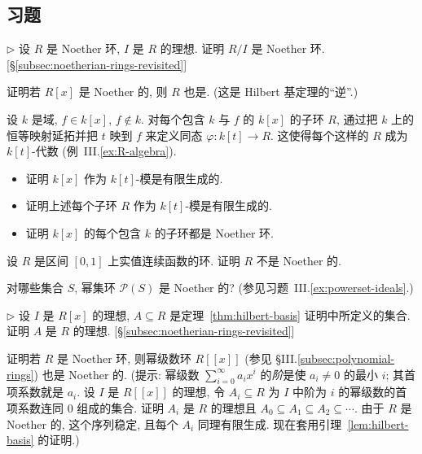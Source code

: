 \subsection*{习题}
{}

\begin{prob}
\label{ex:noeth-quotient}
$\triangleright$ 设 $R$ 是 Noether 环, $I$ 是 $R$ 的理想. 证明 $R/I$ 是 Noether 环. [§\ref{subsec:noetherian-rings-revisited}]
\end{prob}

\begin{prob}
\label{ex:hilbert-converse}
证明若 $R[x]$ 是 Noether 的, 则 $R$ 也是. (这是 Hilbert 基定理的``逆''.)
\end{prob}

\begin{prob}
\label{ex:kt-algebra}
设 $k$ 是域, $f\in k[x]$, $f\notin k$. 对每个包含 $k$ 与 $f$ 的 $k[x]$ 的子环 $R$, 通过把 $k$ 上的恒等映射延拓并把 $t$ 映到 $f$ 来定义同态 $\varphi : k[t]\to R$. 这使得每个这样的 $R$ 成为 $k[t]$-代数 (例~III.\ref{ex:R-algebra}).
\begin{itemize}
\item 证明 $k[x]$ 作为 $k[t]$-模是有限生成的.
\item 证明上述每个子环 $R$ 作为 $k[t]$-模是有限生成的.
\item 证明 $k[x]$ 的每个包含 $k$ 的子环都是 Noether 环.
\end{itemize}
\end{prob}

\begin{prob}
\label{ex:cont-functions-noeth}
设 $R$ 是区间 $[0,1]$ 上实值连续函数的环. 证明 $R$ 不是 Noether 的.
\end{prob}

\begin{prob}
\label{ex:powerset-noeth}
对哪些集合 $S$, 幂集环 $\mathcal{P}(S)$ 是 Noether 的? (参见习题~III.\ref{ex:powerset-ideals}.)
\end{prob}

\begin{prob}
\label{ex:leading-ideal}
$\triangleright$ 设 $I$ 是 $R[x]$ 的理想, $A\subseteq R$ 是定理~\ref{thm:hilbert-basis} 证明中所定义的集合. 证明 $A$ 是 $R$ 的理想. [§\ref{subsec:noetherian-rings-revisited}]
\end{prob}

\begin{prob}
\label{ex:power-series-noeth}
证明若 $R$ 是 Noether 环, 则幂级数环 $R[[x]]$ (参见 §III.\ref{subsec:polynomial-rings}) 也是 Noether 的. (提示: 幂级数 $\sum_{i=0}^\infty a_i x^i$ 的\emph{阶}是使 $a_i\neq 0$ 的最小 $i$; 其首项系数就是 $a_i$. 设 $I$ 是 $R[[x]]$ 的理想, 令 $A_i\subseteq R$ 为 $I$ 中阶为 $i$ 的幂级数的首项系数连同 $0$ 组成的集合. 证明 $A_i$ 是 $R$ 的理想且 $A_0\subseteq A_1\subseteq A_2\subseteq \cdots$. 由于 $R$ 是 Noether 的, 这个序列稳定, 且每个 $A_i$ 同理有限生成. 现在套用引理~\ref{lem:hilbert-basis} 的证明.)
\end{prob}

